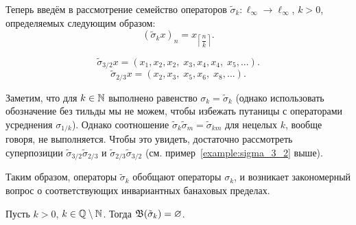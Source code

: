 
Теперь
введём в рассмотрение семейство операторов
$\tilde\sigma_k : \ell_\infty \to \ell_\infty$, $k>0$,
определяемых следующим образом:
\begin{equation}
	(\tilde\sigma_k x)_n = x_{\left\lceil \dfrac{n}{k}\right\rceil}
	.
\end{equation}

\begin{example}
	\label{example:sigma_3_2}
	\begin{equation}
		\tilde\sigma_{3/2} x =
		(x_1, x_2, x_2, \; x_3, x_4, x_4, \; x_5, ...)
		.
	\end{equation}
	\begin{equation}
		\tilde\sigma_{2/3} x =
		(x_2, x_3, \; x_5, x_6, \; x_8, ...)
		.
	\end{equation}
\end{example}


Заметим, что для $k\in \mathbb{N}$ выполнено равенство $\sigma_k = \tilde\sigma_k$
(однако использовать обозначение без тильды мы не можем, чтобы избежать путаницы с операторами усреднения $\sigma_{1/k}$).
Однако соотношение $\tilde\sigma_k \tilde\sigma_m = \tilde\sigma_{km}$ для нецелых $k$, вообще говоря, не выполняется.
Чтобы это увидеть, достаточно рассмотреть суперпозиции $\tilde\sigma_{3/2} \tilde\sigma_{2/3}$ и
$\tilde\sigma_{2/3} \tilde\sigma_{3/2}$ (см. пример~\ref{example:sigma_3_2} выше).

Таким образом, операторы $\tilde\sigma_k$ обобщают операторы $\sigma_k$,
и возникает закономерный вопрос о соответствующих инвариантных банаховых пределах.

\begin{proposition}
	Пусть $k>0$, $k\in \mathbb{Q} \setminus \mathbb{N}$.
	Тогда $\mathfrak{B}(\tilde\sigma_k)=\varnothing$.
\end{proposition}


